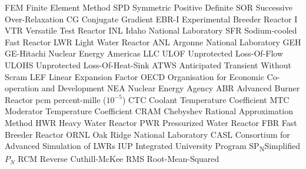 \makeglossaries

   {FEM}   {Finite Element Method}
   {SPD}   {Symmetric Positive Definite}
   {SOR}   {Successive Over-Relaxation}
    {CG}    {Conjugate Gradient}
 {EBR-I} {Experimental Breeder Reactor I}
   {VTR}   {Versatile Test Reactor}
   {INL}   {Idaho National Laboratory}
   {SFR}   {Sodium-cooled Fast Reactor}
   {LWR}   {Light Water Reactor}
   {ANL}   {Argonne National Laboratory}
   {GEH}   {GE-Hitachi Nuclear Energy Americas LLC}
  {ULOF}  {Unprotected Loss-Of-Flow}
 {ULOHS} {Unprotected Loss-Of-Heat-Sink}
  {ATWS}  {Anticipated Transient Without Scram}
   {LEF}   {Linear Expansion Factor}
  {OECD}  {Organisation for Economic Co-operation and Development}
   {NEA}   {Nuclear Energy Agency}
   {ABR}   {Advanced Burner Reactor}
   {pcm}   {percent-mille ($10^{-5}$)}
   {CTC}   {Coolant Temperature Coefficient}
   {MTC}   {Moderator Temperature Coefficient}
  {CRAM}  {Chebyshev Rational Approximation Method}
   {HWR}   {Heavy Water Reactor}
   {PWR}   {Pressurized Water Reactor}
   {FBR}   {Fast Breeder Reactor}
  {ORNL}  {Oak Ridge National Laboratory}
  {CASL}  {Consortium for Advanced Simulation of LWRs}
   {IUP}   {Integrated University Program}
   {SP\textsubscript{N}}{Simplified $P_N$}
   {RCM}   {Reverse Cuthill-McKee}
   {RMS}   {Root-Mean-Squared}

